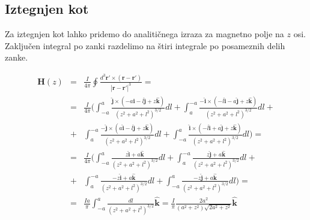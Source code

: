 \documentclass[12pt, a4paper]{article}
\begin{document}
\begin{comment}
\begin{figure}[h]
  \centering
  \begin{subfigure}[b]{0.45\textwidth}
    \centering
    \texttt{[image: grafiP/y0\_2pi3.png]}
    \caption{$\alpha = \frac{\pi}{3}$}
    \label{graf}
  \end{subfigure}
  \begin{subfigure}[b]{0.45\textwidth}
    \centering
    \texttt{[image: grafiP/y0\_pi.png]}
    \caption{$\alpha = \frac{3\pi}{4}$}
    \label{graf}
  \end{subfigure}
  \caption{Skica problema.}
\end{figure}
\end{comment}





\subsection{Iztegnjen kot} %

Za iztegnjen kot lahko pridemo do analitičnega izraza za magnetno polje na $z$ osi. Zaključen integral po zanki razdelimo na štiri integrale po posameznih delih zanke.

\begin{eqnarray}
  \mathbf{H}(z)& = & \frac{I}{4\pi}\oint\frac{ d^3\mathbf{r'} \times( \mathbf{r}- \mathbf{r'})}{| \mathbf{r} -  \mathbf{r'}|^3} = \nonumber \\
& = & \frac{I}{4\pi} ( \int_{-a}^{a} \frac{\mathbf{\hat{j}} \times (-a \mathbf{\hat{i}} -l\mathbf{\hat{j}} + z\mathbf{\hat{k}})}{(z^2 + a^2 + l^2)^{3/2}} dl  +
\int_{a}^{-a} \frac{\mathbf{-\hat{i}} \times (-l \mathbf{\hat{i}} - a\mathbf{\hat{j}} + z\mathbf{\hat{k}})}{(z^2 + a^2 + l^2)^{3/2}} dl + \nonumber \\
& + & \int_{a}^{-a} \frac{\mathbf{-\hat{j}} \times (a \mathbf{\hat{i}} -l\mathbf{\hat{j}} + z\mathbf{\hat{k}})}{(z^2 + a^2 + l^2)^{3/2}} dl  +
\int_{-a}^{a} \frac{\mathbf{\hat{i}} \times (-l \mathbf{\hat{i}} + a \mathbf{\hat{j}} + z\mathbf{\hat{k}})}{(z^2 + a^2 + l^2)^{3/2}} dl  )  =  \nonumber \\
 & = & \frac{I}{4\pi} ( \int_{-a}^{a} \frac{z \mathbf{\hat{i}} + a\mathbf{\hat{k}}}{(z^2 + a^2 + l^2)^{3/2}} dl + 
\int_{a}^{-a} \frac{z \mathbf{\hat{j}} + a\mathbf{\hat{k}}}{(z^2 + a^2 + l^2)^{3/2}} dl +  \nonumber \\
 & + & \int_{a}^{-a} \frac{-z \mathbf{\hat{i}} + a\mathbf{\hat{k}}}{(z^2 + a^2 + l^2)^{3/2}} dl + 
\int_{-a}^{a} \frac{-z \mathbf{\hat{j}} + a\mathbf{\hat{k}}}{(z^2 + a^2 + l^2)^{3/2}} dl ) = \nonumber \\
& = & \frac{Ia}{\pi} \int_{-a}^a \frac{dl}{(z^2 + a^2 + l^2)^{3/2}} \mathbf{\hat{k}} = 
\frac{I}{\pi} \frac{2a^2}{(a^2 + z^2)\sqrt{2a^2 + z^2}} \mathbf{\hat{k}}
\end{eqnarray}
\end{document}
